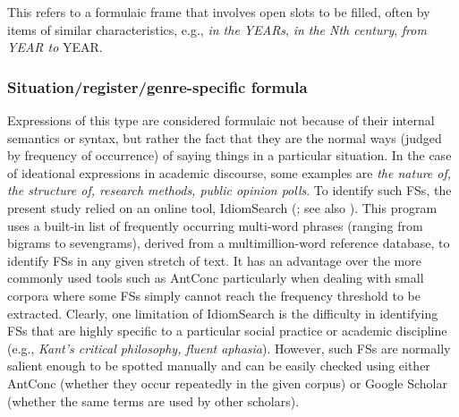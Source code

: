 \documentclass[output=paper]{langscibook}
\begin{document}
This refers to a formulaic frame that involves open slots to be filled, often by items of similar characteristics, e.g., \textit{in the YEARs}, \textit{in the Nth century}, \textit{from YEAR to} YEAR.

\subsubsection{Situation/register/genre-specific formula \citep{Wray2008,Buerki2016}}

Expressions of this type are considered formulaic not because of their internal semantics or syntax, but rather the fact that they are the normal ways (judged by frequency of occurrence) of saying things in a particular situation. In the case of ideational expressions in academic discourse, some examples are \textit{the nature of, the structure of, research methods, public opinion polls}. To identify such FSs, the present study relied on an online tool, IdiomSearch (\citealt{Colson2016Idiom}; see also \citealt{Colson2016Set}). This program uses a built-in list of frequently occurring multi-word phrases (ranging from bigrams to sevengrams), derived from a multimillion-word reference database, to identify FSs in any given stretch of text. It has an advantage over the more commonly used tools such as AntConc particularly when dealing with small corpora where some FSs simply cannot reach the frequency threshold to be extracted. Clearly, one limitation of IdiomSearch is the difficulty in identifying FSs that are highly specific to a particular social practice or academic discipline (e.g., \textit{Kant’s critical philosophy, fluent aphasia}). However, such FSs are normally salient enough to be spotted manually and can be easily checked using either AntConc (whether they occur repeatedly in the given corpus) or Google Scholar (whether the same terms are used by other scholars).
\end{document}
